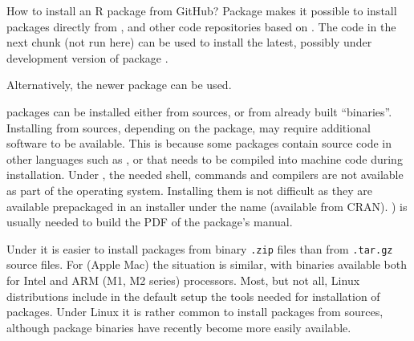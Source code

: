 \documentclass[krantz2]{krantz}\usepackage{knitr}
\begin{document}
\begin{faqbox}{How to install an R package from GitHub?}
Package  makes it possible to install packages directly from \GitHub, \Bitbucket and other code repositories based on . The code in the next chunk (not run here) can be used to install the latest, possibly under development version of package .

\begin{knitrout}\footnotesize
{}\color{fgcolor}\begin{kframe}
\begin{alltt}
\hlopt{::}\hlstd{(}\hlstd{)}
\end{alltt}
\end{kframe}
\end{knitrout}

Alternatively, the newer package  can be used.

\begin{knitrout}\footnotesize
{}\color{fgcolor}\begin{kframe}
\begin{alltt}
\hlopt{::}\hlstd{(}\hlstd{)}
\end{alltt}
\end{kframe}
\end{knitrout}

\end{faqbox}

\Rpgrm packages can be installed either from sources, or from already built ``binaries''. Installing from sources, depending on the package, may require additional software to be available. This is because some \Rlang packages contain source code in other languages such as \Clang, \Cpplang or  that needs to be compiled into machine code during installation. Under , the needed shell, commands and compilers are not available as part of the operating system. Installing them is not difficult as they are available prepackaged in an installer under the name  (available from CRAN). ) is usually needed to build the PDF of the package's manual.

Under  it is easier to install packages from binary \texttt{.zip} files than from \texttt{.tar.gz} source files. For  (Apple Mac) the situation is similar, with binaries available both for Intel and ARM (M1, M2 series) processors. Most, but not all, Linux distributions include in the default setup the tools needed for installation of \Rlang packages. Under Linux it is rather common to install packages from sources, although package binaries have recently become more easily available.
\end{document}
